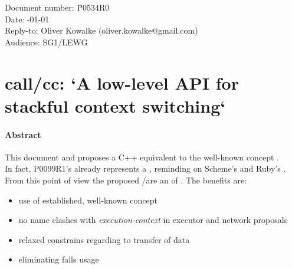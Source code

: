 \documentclass[paper=A4,pagesize,DIV=15]{scrartcl}
\begin{document}
\small
\begin{tabbing}
    Document number: \= P0534R0\\
    Date:            -01-01\\
    Reply-to:        \> Oliver Kowalke (oliver.kowalke@gmail.com)\\
    Audience:        \> SG1/LEWG\\
\end{tabbing}

\section*{call/cc: `A low-level API for stackful context switching`}


\tableofcontents


\paragraph*{Abstract}
This document  and proposes a C++
equivalent to the well-known concept \callcc.\\
In fact, P0099R1's \ectx already represents a ,
reminding on Scheme's\cite{schemecallcc} and Ruby's\cite{rubycallcc} \cc.
From this point of view the proposed \call/\cont are an  of
\ectx. The benefits are:
\begin{itemize}
    \item   use of established, well-known concept
    \item   no name clashes with \emph{execution-context} in
            executor and network proposals
    \item   relaxed constrains regarding to transfer of data
    \item   eliminating falls usage
\end{itemize}




%
%
%
%




\end{document}

